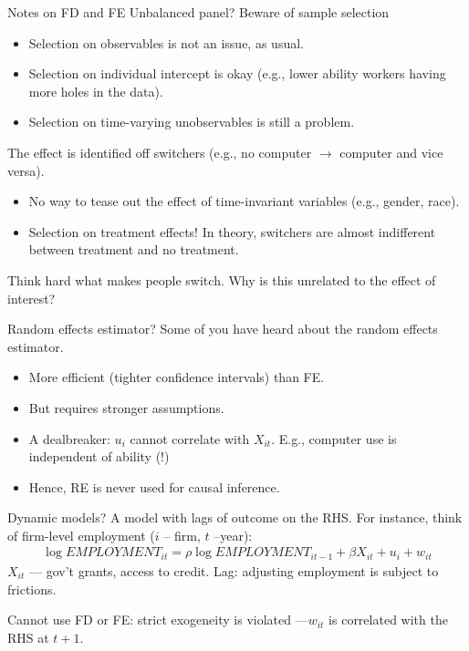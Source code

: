 \documentclass[notes=show,beamer,compress]{beamer}
\begin{document}
\begin{frame}{Notes on FD and FE}
Unbalanced panel? Beware of sample selection
\begin{itemize}
	\item{Selection on observables is not an issue, as usual.}
	\item{Selection on individual intercept is okay (e.g., lower ability workers having more holes in the data).}
	\item{Selection on time-varying unobservables is still a problem.}
\end{itemize}
The effect is identified off switchers (e.g., no computer $\to$ computer and vice versa). 
\begin{itemize}
	\item{No way to tease out the effect of time-invariant variables (e.g., gender, race).}
	\item{Selection on treatment effects! In theory, switchers are almost indifferent between treatment and no treatment.}
\end{itemize}
Think hard what makes people switch. Why is this unrelated to the effect of interest?
\end{frame}

\begin{frame}{Random effects estimator?}
	Some of you have heard about the random effects estimator.
	\begin{itemize}
		\item{More efficient (tighter confidence intervals) than FE.}
		\item{But requires stronger assumptions.}
		\item{A dealbreaker: $u_i$ cannot correlate with $X_{it}$. E.g., computer use is independent of ability (!)}
		\item{Hence, RE is never used for causal inference.}
	\end{itemize}
\end{frame}

\begin{frame}{Dynamic models?}
A model with lags of outcome on the RHS. For instance, think of firm-level employment ($i$ -- firm, $t$ --year):
\begin{multline*}
	\log{EMPLOYMENT_{it}} = \rho\log{EMPLOYMENT_{it-1}} + \beta{}X_{it} + u_i + w_{it}
\end{multline*}
$X_{it}$ --- gov't grants, access to credit. Lag: adjusting employment is subject to frictions.\\\medskip

Cannot use FD or FE: strict exogeneity is violated ---$w_{it}$ is correlated with the RHS at $t+1$.
\end{frame}
\end{document}
